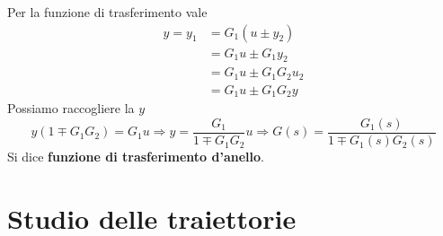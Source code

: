 \documentclass[10pt,a4paper]{book}
\begin{document}
Per la funzione di trasferimento vale
\begin{equation*}
\begin{aligned}
y=y_{1} & =G_{1}\left( u\pm y_{2}\right)\\
 & =G_{1} u\pm G_{1} y_{2}\\
 & =G_{1} u\pm G_{1} G_{2} u_{2}\\
 & =G_{1} u\pm G_{1} G_{2} y
\end{aligned}
\end{equation*}
Possiamo raccogliere la $y$
\begin{equation*}
y\left( 1\mp G_{1} G_{2}\right) =G_{1} u\Rightarrow y=\frac{G_{1}}{1\mp G_{1} G_{2}} u\Rightarrow \boxed{G\left( s\right) =\frac{G_{1}\left( s\right)}{1\mp G_{1}\left( s\right) G_{2}\left( s\right)}}
\end{equation*}
Si dice \textbf{funzione di trasferimento d'anello}.
\chapter{Studio delle traiettorie}
\end{document}

